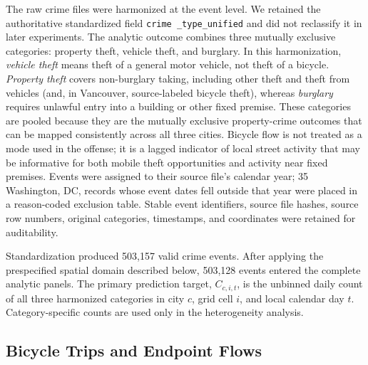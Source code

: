 \documentclass[applsci,article,accept,moreauthors]{Definitions/mdpi}
\def\hl#1{#1}%
\newcommand{\TotalCrimeEvents}{503,128}
\begin{document}
The raw crime files were harmonized at the event level. We retained the
authoritative standardized field \texttt{\hl{crime}%
\_type\_unified} and did not
reclassify it in later experiments. The analytic outcome combines three
mutually exclusive categories: property theft, vehicle theft, and burglary.
{In this harmonization, \emph{\hl{vehicle theft}%
} means theft of a general
motor vehicle, not theft of a bicycle. \emph{\hl{Property theft}} covers
non-burglary taking, including other theft and theft from vehicles (and, in
Vancouver, source-labeled bicycle theft), whereas \emph{\hl{burglary}} requires
unlawful entry into a building or other fixed premise. These categories are
pooled because they are the mutually exclusive property-crime outcomes that
can be mapped consistently across all three cities. Bicycle flow is not
treated as a mode used in the offense; it is a lagged indicator of local
street activity that may be informative for both mobile theft opportunities
and activity near fixed premises.}
Events were assigned to their source
file's calendar year; 35 Washington, DC, records whose event dates fell
outside that year were placed in a reason-coded exclusion table. Stable
event identifiers, source file hashes, source row numbers, original
categories, timestamps, and coordinates were retained for auditability.

Standardization produced 503,157 valid crime events. After applying the prespecified
spatial domain described below, \TotalCrimeEvents{} events entered the
complete analytic panels. The primary prediction target,
\(C_{c,i,t}\), is the unbinned daily count of all three harmonized
categories in city \(c\), grid cell \(i\), and local calendar day \(t\).
Category-specific counts are used only in the heterogeneity analysis.

\subsection{Bicycle Trips and Endpoint Flows}
\label{subsec:bicycle_data}
\end{document}
